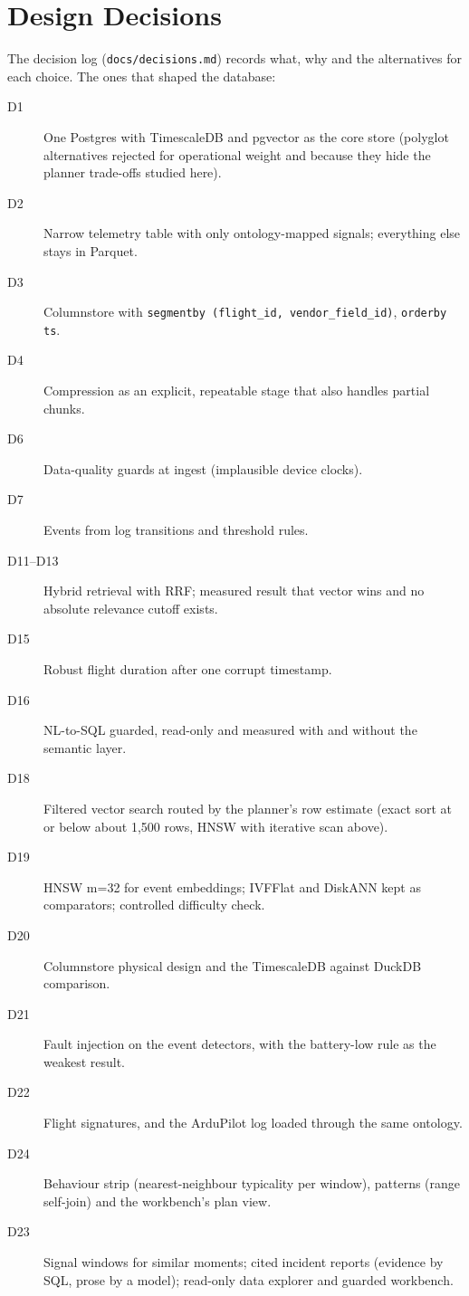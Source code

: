 \documentclass[11pt,a4paper]{article}
\newcommand{\code}[1]{\texttt{#1}}
\begin{document}
\section{Design Decisions}
The decision log (\code{docs/decisions.md}) records what, why and the alternatives for each choice. The ones that shaped the database:
\begin{description}
  \item[D1] One Postgres with TimescaleDB and pgvector as the core store (polyglot alternatives rejected for operational weight and because they hide the planner trade-offs studied here).
  \item[D2] Narrow telemetry table with only ontology-mapped signals; everything else stays in Parquet.
  \item[D3] Columnstore with \code{segmentby (flight\_id, vendor\_field\_id)}, \code{orderby ts}.
  \item[D4] Compression as an explicit, repeatable stage that also handles partial chunks.
  \item[D6] Data-quality guards at ingest (implausible device clocks).
  \item[D7] Events from log transitions and threshold rules.
  \item[D11--D13] Hybrid retrieval with RRF; measured result that vector wins and no absolute relevance cutoff exists.
  \item[D15] Robust flight duration after one corrupt timestamp.
  \item[D16] NL-to-SQL guarded, read-only and measured with and without the semantic layer.
  \item[D18] Filtered vector search routed by the planner's row estimate (exact sort at or below about 1,500 rows, HNSW with iterative scan above).
  \item[D19] HNSW m=32 for event embeddings; IVFFlat and DiskANN kept as comparators; controlled difficulty check.
  \item[D20] Columnstore physical design and the TimescaleDB against DuckDB comparison.
  \item[D21] Fault injection on the event detectors, with the battery-low rule as the weakest result.
  \item[D22] Flight signatures, and the ArduPilot log loaded through the same ontology.
  \item[D24] Behaviour strip (nearest-neighbour typicality per window), patterns (range self-join) and the workbench's plan view.
  \item[D23] Signal windows for similar moments; cited incident reports (evidence by SQL, prose by a model); read-only data explorer and guarded workbench.
\end{description}
\end{document}
